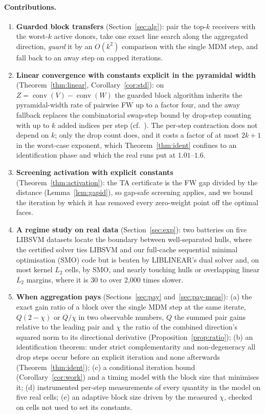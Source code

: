 \documentclass[pdflatex,sn-apa]{sn-jnl}%
\theoremstyle{thmstyleone}
\theoremstyle{thmstyletwo}
\newcommand{\conv}{\operatorname{conv}}
\begin{document}
\paragraph{Contributions.}
\begin{enumerate}\setlength\itemsep{0pt}
\item \textbf{Guarded block transfers} (Section~\ref{sec:alg}): pair the top-$k$
receivers with the worst-$k$ active donors, take one exact line search
along the aggregated direction, \emph{guard} it by an $O(k^2)$
comparison with the single MDM step, and fall back to an away step on
capped iterations.
\item \textbf{Linear convergence with constants explicit in the
pyramidal width} (Theorem~\ref{thm:linear}, Corollary~\ref{cor:std}): on
$Z=\conv(V)-\conv(W)$ the guarded block algorithm inherits the
pyramidal-width rate of pairwise FW \citep{lj2015} up to a factor
four, and the away fallback replaces the combinatorial swap-step bound
by drop-step counting with up to $k$ added indices per step (cf.\
\citealp{tsuji2022}). The per-step contraction does not depend on $k$;
only the drop count does, and it costs a factor of at most $2k+1$ in the
worst-case exponent, which Theorem~\ref{thm:ident} confines to an
identification phase and which the real runs put at $1.01$--$1.6$.
\item \textbf{Screening activation with explicit constants}
(Theorem~\ref{thm:activation}): the TA certificate is the FW gap divided
by the distance (Lemma~\ref{lem:gapid}), so gap-safe screening
\citep{ndiaye2017} applies, and we bound the iteration by which it has
removed every zero-weight point off the optimal faces.
\item \textbf{A regime study on real data} (Section~\ref{sec:exp}): two
batteries on five LIBSVM datasets locate the boundary between
well-separated hulls, where the certified solver ties LIBSVM and our
full-cache sequential minimal optimisation (SMO) code but is beaten by
LIBLINEAR's dual solver and, on most kernel $L_2$ cells, by SMO, and
nearly touching hulls or overlapping linear $L_2$ margins, where it is
30 to over 2,000 times slower.
\item \textbf{When aggregation pays} (Sections~\ref{sec:pay}
and~\ref{sec:pay-meas}): (a) the exact gain ratio of a block over the
single MDM step at the same iterate, $Q(2-\chi)$ or $Q/\chi$ in two
observable numbers, $Q$ the summed pair gains relative to the leading
pair and $\chi$ the ratio of the combined direction's squared norm to
its directional derivative (Proposition~\ref{prop:ratio}); (b) an
identification theorem: under strict complementarity and
non-degeneracy all drop steps occur before an explicit iteration and
none afterwards (Theorem~\ref{thm:ident}); (c) a conditional iteration
bound (Corollary~\ref{cor:work}) and a timing model with the block size
that minimises it; (d) instrumented per-step measurements of every quantity
in the model on five real cells; (e) an adaptive block size driven by
the measured $\chi$, checked on cells not used to set its constants.
\end{enumerate}
\end{document}
